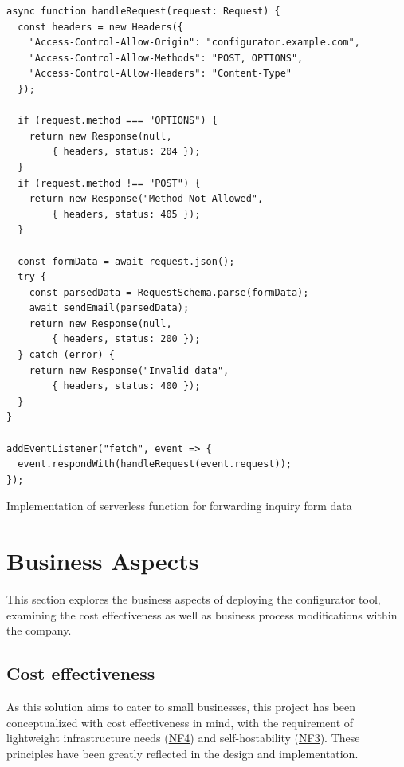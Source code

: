 \begin{listing}[h!]
\begin{verbatim}
async function handleRequest(request: Request) {
  const headers = new Headers({
    "Access-Control-Allow-Origin": "configurator.example.com",
    "Access-Control-Allow-Methods": "POST, OPTIONS",
    "Access-Control-Allow-Headers": "Content-Type"
  });

  if (request.method === "OPTIONS") {
    return new Response(null,
        { headers, status: 204 });
  }
  if (request.method !== "POST") {
    return new Response("Method Not Allowed",
        { headers, status: 405 });
  }

  const formData = await request.json();
  try {
    const parsedData = RequestSchema.parse(formData);
    await sendEmail(parsedData);
    return new Response(null, 
        { headers, status: 200 });
  } catch (error) {
    return new Response("Invalid data",
        { headers, status: 400 });
  }
}

addEventListener("fetch", event => {
  event.respondWith(handleRequest(event.request));
});
\end{verbatim}
\caption{Implementation of serverless function for forwarding inquiry form data}
\label{listing:serverless}
\end{listing}


\section{Business Aspects}

This section explores the business aspects of deploying the configurator tool, examining the cost effectiveness as well as business process modifications within the company.


\subsection{Cost effectiveness}

As this solution aims to cater to small businesses, this project has been conceptualized with cost effectiveness in mind, with the requirement of lightweight infrastructure needs (\hyperref[itm:NF4]{NF4}) and self-hostability (\hyperref[itm:NF3]{NF3}). These principles have been greatly reflected in the design and implementation.

